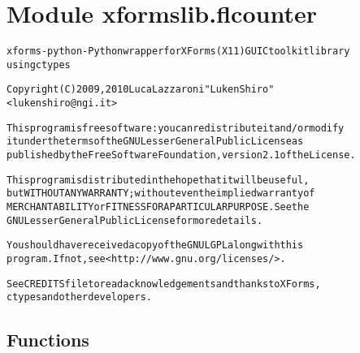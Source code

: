 %
%
%


\section{Module xformslib.flcounter}

    \label{xformslib:flcounter}
\begin{alltt}

xforms-python - Python wrapper for XForms (X11) GUI C toolkit library
using ctypes

Copyright (C) 2009, 2010  Luca Lazzaroni "LukenShiro"
    {\textless}lukenshiro@ngi.it{\textgreater}

This program is free software: you can redistribute it and/or modify
it under the terms of the GNU Lesser General Public License as
published by the Free Software Foundation, version 2.1 of the License.

This program is distributed in the hope that it will be useful,
but WITHOUT ANY WARRANTY; without even the implied warranty of
MERCHANTABILITY or FITNESS FOR A PARTICULAR PURPOSE. See the
GNU Lesser General Public License for more details.

You should have received a copy of the GNU LGPL along with this
program. If not, see {\textless}http://www.gnu.org/licenses/{\textgreater}.

See CREDITS file to read acknowledgements and thanks to XForms,
ctypes and other developers.
\end{alltt}



  \subsection{Functions}

    \label{xformslib:flcounter:fl_add_counter}

